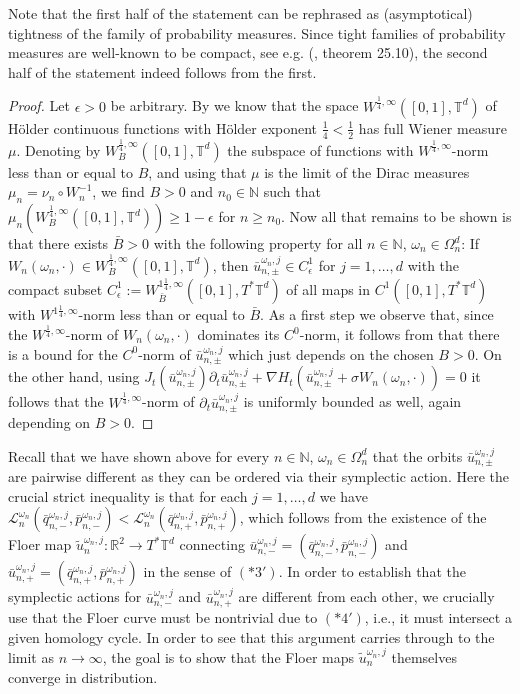 \documentclass[a4paper,11pt]{amsart}
\newcommand{\NN}{\mathbb{N}}
\newcommand{\RR}{\mathbb{R}}
\newcommand{\TT}{\mathbb{T}}
\begin{document}
Note that the first half of the statement can be rephrased as (asymptotical) tightness of the family of probability measures. Since tight families of probability measures are well-known to be compact, see e.g. (\cite{Bi}, theorem 25.10), the second half of the statement indeed follows from the first.
\begin{proof}
Let $\epsilon>0$ be arbitrary. By  we know that the space $W^{\frac{1}{4},\infty}([0,1],\TT^d)$ of Hölder continuous functions with Hölder exponent $\frac{1}{4}<\frac{1}{2}$ has full Wiener measure $\mu$. Denoting by $W^{\frac{1}{4},\infty}_B([0,1],\TT^d)$ the subspace of functions with $W^{\frac{1}{4},\infty}$-norm less than or equal to $B$, and using that $\mu$ is the limit of the Dirac measures $\mu_n=\nu_n\circ W_n^{-1}$, we find $B>0$ and $n_0\in\NN$ such that $\mu_n(W^{\frac{1}{4},\infty}_B([0,1],\TT^d))\geq 1-\epsilon$ for $n\geq n_0$. Now all that remains to be shown is that there exists $\bar{B}>0$ with the following property for all $n\in\NN$, $\omega_n\in\Omega_n^d$: If $W_n(\omega_n,\cdot)\in W^{\frac{1}{4},\infty}_B([0,1],\TT^d)$, then $\bar{u}^{\omega_n,j}_{n,\pm}\in C^1_{\epsilon}$ for $j=1,\ldots,d$ with the compact subset $C^1_{\epsilon}:=W^{1\frac{1}{4},\infty}_{\bar{B}}([0,1],T^*\TT^d)$ of all maps in $C^1([0,1],T^*\TT^d)$ with $W^{1\frac{1}{4},\infty}$-norm less than or equal to $\bar{B}$. As a first step we observe that, since the $W^{\frac{1}{4},\infty}$-norm of $W_n(\omega_n,\cdot)$ dominates its $C^0$-norm, it follows from  that there is a bound for the $C^0$-norm of $\bar{u}^{\omega_n,j}_{n,\pm}$ which just depends on the chosen $B>0$. On the other hand, using $J_t(\bar{u}^{\omega_n,j}_{n,\pm})\partial_t\bar{u}^{\omega_n,j}_{n,\pm}+\nabla H_t(\bar{u}^{\omega_n,j}_{n,\pm}+\sigma W_n(\omega_n,\cdot))=0$ it follows that the $W^{\frac{1}{4},\infty}$-norm of $\partial_t\bar{u}^{\omega_n,j}_{n,\pm}$ is uniformly bounded as well, again depending on $B>0$. 
\end{proof}
Recall that we have shown above for every $n\in\NN$, $\omega_n\in\Omega_n^d$ that the orbits $\bar{u}^{\omega_n,j}_{n,\pm}$ are pairwise different as they can be ordered via their symplectic action. Here the crucial strict inequality is that for each $j=1,\ldots,d$ we have $\mathcal{L}_n^{\omega_n}(\bar{q}^{\omega_n,j}_{n,-},\bar{p}^{\omega_n,j}_{n,-})<\mathcal{L}_n^{\omega_n}(\bar{q}^{\omega_n,j}_{n,+},\bar{p}^{\omega_n,j}_{n,+})$, which follows from the existence of the Floer map $\widetilde{u}^{\omega_n,j}_n:\RR^2\to T^*\TT^d$ connecting $\bar{u}^{\omega_n,j}_{n,-}=(\bar{q}^{\omega_n,j}_{n,-},\bar{p}^{\omega_n,j}_{n,-})$ and $\bar{u}^{\omega_n,j}_{n,+}=(\bar{q}^{\omega_n,j}_{n,+},\bar{p}^{\omega_n,j}_{n,+})$ in the sense of $(*3')$. In order to establish that the symplectic actions for $\bar{u}^{\omega_n,j}_{n,-}$ and $\bar{u}^{\omega_n,j}_{n,+}$ are different from each other, we crucially use that the Floer curve must be nontrivial due to $(*4')$, i.e., it must intersect a given homology cycle. In order to see that this argument carries through to the limit as $n\to\infty$, the goal is to show that the Floer maps $\widetilde{u}^{\omega_n,j}_n$ themselves converge in distribution.\\
\end{document}

